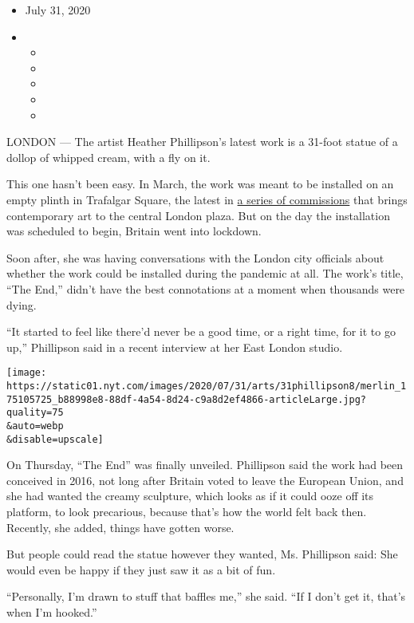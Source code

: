 \begin{itemize}
\item
  July 31, 2020
\item
  \begin{itemize}
  \item
  \item
  \item
  \item
  \item
  \end{itemize}
\end{itemize}

LONDON --- The artist Heather Phillipson's latest work is a 31-foot
statue of a dollop of whipped cream, with a fly on it.

This one hasn't been easy. In March, the work was meant to be installed
on an empty plinth in Trafalgar Square, the latest in
\href{https://www.nytimes.com/2017/01/19/arts/design/london-fourth-plinth-art.html}{a
series of commissions} that brings contemporary art to the central
London plaza. But on the day the installation was scheduled to begin,
Britain went into lockdown.

Soon after, she was having conversations with the London city officials
about whether the work could be installed during the pandemic at all.
The work's title, ``The End,'' didn't have the best connotations at a
moment when thousands were dying.

``It started to feel like there'd never be a good time, or a right time,
for it to go up,'' Phillipson said in a recent interview at her East
London studio.

\texttt{[image: https://static01.nyt.com/images/2020/07/31/arts/31phillipson8/merlin\_175105725\_b88998e8-88df-4a54-8d24-c9a8d2ef4866-articleLarge.jpg?quality=75\\\&auto=webp\\\&disable=upscale]}

On Thursday, ``The End'' was finally unveiled. Phillipson said the work
had been conceived in 2016, not long after Britain voted to leave the
European Union, and she had wanted the creamy sculpture, which looks as
if it could ooze off its platform, to look precarious, because that's
how the world felt back then. Recently, she added, things have gotten
worse.

But people could read the statue however they wanted, Ms. Phillipson
said: She would even be happy if they just saw it as a bit of fun.

``Personally, I'm drawn to stuff that baffles me,'' she said. ``If I
don't get it, that's when I'm hooked.''

